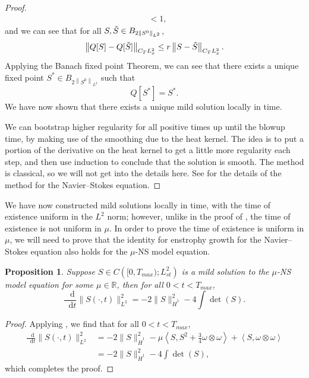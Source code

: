 \documentclass[11pt]{article}
\theoremstyle{plain}
\newtheorem{proposition}[theorem]{Proposition}
\theoremstyle{remark}
\numberwithin{equation}{section}
\newcommand{\diff}{\mathop{}\!\mathrm{d}}
\begin{document}
\begin{proof}
\begin{align}
    &<1,
\end{align}
and we can see that for all 
$S,\Tilde{S}\in
B_{2\left\|S^0\right\|_{L^2}}$,
\begin{equation}
    \left\|Q[S]-Q[\Tilde{S}]\right\|_{C_T L^2_x}
    \leq r
    \left\|S-\Tilde{S}
    \right\|_{C_T L^2_x}.
\end{equation}
Applying the Banach fixed point Theorem, we can see that there exists a unique fixed point $S^*\in B_{2\left\|S^0\right\|_{L^2}}$ such that 
\begin{equation}
    Q[S^*]=S^*.
\end{equation}
We have now shown that there exists a unique mild solution locally in time.

We can bootstrap higher regularity for all positive times up until the blowup time, by making use of the smoothing due to the heat kernel. The idea is to put a portion of the derivative on the heat kernel to get a little more regularity each step, and then use induction to conclude that the solution is smooth. The method is classical, so we will not get into the details here. See \cite{KatoFujita} for the details of the method for the Navier--Stokes equation.
\end{proof}


We have now constructed mild solutions locally in time, with the time of existence uniform in the $L^2$ norm; however, unlike in the proof of , the time of existence is not uniform in $\mu$. In order to prove the time of existence is uniform in $\mu$, we will need to prove that the identity for enstrophy growth for the Navier--Stokes equation also holds for the $\mu$-NS model equation.


\begin{proposition} \label{EnstrophyProp}
    Suppose $S\in C\left([0,T_{max});L^2_{st}\right)$ is a mild solution to the $\mu$-NS model equation 
    for some $\mu\in\mathbb{R}$,
    then for all $0<t<T_{max}$,
    \begin{equation}
    \frac{\diff}{\diff t}
    \|S(\cdot,t)\|_{L^2}^2=
    -2\|S\|_{\dot{H}^1}^2 -4\int\det(S).
\end{equation}
\end{proposition}


\begin{proof}
    Applying ,
    we find that for all $0<t<T_{max}$,
    \begin{align}
    \frac{\diff}{\diff t}
    \|S(\cdot,t)\|_{L^2}^2
    &=
    -2\|S\|_{\dot{H}^1}^2
    -\mu \left<
    S,S^2+\frac{3}{4}
    \omega\otimes\omega\right>
    +\left<S,\omega\otimes\omega\right> \\
    &=
    -2\|S\|_{\dot{H}^1}^2
    -4\int\det(S),
    \end{align}
    which completes the proof.
\end{proof}
\end{document}

